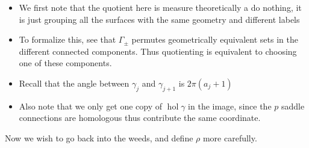 \documentclass[20pt]{article}
\theoremstyle{definition}
\newcommand{\hol}{\operatorname{hol}}
\begin{document}
    \begin{itemize}
        \item We first note that the quotient here is measure theoretically a do nothing, it is just grouping all the surfaces with the same geometry and different labels
        \item To formalize this, see that \(\Gamma_{\pm}\) permutes geometrically equivalent sets in the different connected components. Thus quotienting is equivalent to choosing one of these components.
        \item Recall that the angle between \(\gamma_j\) and \(\gamma_{j+1}\) is \(2\pi(a_j + 1)\)
        \item Also note that we only get one copy of \(\hol\gamma\) in the image, since the \(p\) saddle connections are homologous thus contribute the same coordinate.
    \end{itemize}

    Now we wish to go back into the weeds, and define \(\rho\) more carefully.
    
\end{document}
